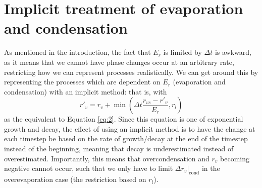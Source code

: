 \documentclass[11pt]{article}
\begin{document}
\section{Implicit treatment of evaporation and condensation}
As mentioned in the introduction, the fact that $E_r$ is limited by $\Delta t$ is awkward, as it means that we cannot have phase changes occur at an arbitrary rate, restricting how we can represent processes realistically. We can get around this by representing the processes which are dependent on $E_r$ (evaporation and condensation) with an implicit method: that is, with
\begin{equation} \label{eq:implicit_def}
r'_v = r_v + \min\left(\Delta t\frac{r_{vs} - r'_v}{E_r},r_l\right)
\end{equation}
as the equivalent to Equation \ref{eq:2}. Since this equation is one of exponential growth and decay, the effect of using an implicit method is to have the change at each timestep be based on the rate of growth/decay at the end of the timestep instead of the beginning, meaning that decay is underestimated instead of overestimated. Importantly, this means that overcondensation and $r_v$ becoming negative cannot occur, such that we only have to limit $\Delta r_v|_{\text{cond}}$ in the overevaporation case (the restriction based on $r_l$).
\end{document}
